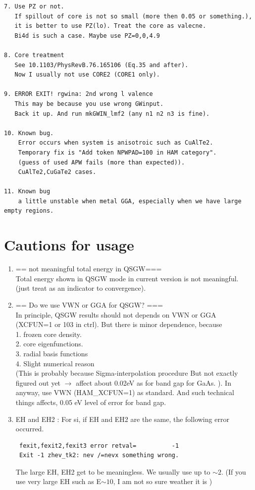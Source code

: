 \documentclass[a4paper,10pt,epsf,fleqn]{article}
\begin{document}
{\begin{verbatim}
7. Use PZ or not.
   If spillout of core is not so small (more then 0.05 or something.),
   it is better to use PZ(lo). Treat the core as valecne.
   Bi4d is such a case. Maybe use PZ=0,0,4.9

8. Core treatment 
   See 10.1103/PhysRevB.76.165106 (Eq.35 and after).
   Now I usually not use CORE2 (CORE1 only).

9. ERROR EXIT! rgwina: 2nd wrong l valence
   This may be because you use wrong GWinput.
   Back it up. And run mkGWIN_lmf2 (any n1 n2 n3 is fine).

10. Known bug.
    Error occurs when system is anisotroic such as CuAlTe2. 
    Temporary fix is "Add token NPWPAD=100 in HAM category".
    (guess of used APW fails (more than expected)).
    CuAlTe2,CuGaTe2 cases.

11. Known bug
    a little unstable when metal GGA, especially when we have large empty regions.
\end{verbatim}

\section{Cautions for usage}
\label{cautionusage}
\begin{enumerate}
 \item == not meaningful total energy in QSGW===\\
 Total energy shown in QSGW mode in current version is not meaningful. 
(just treat as an indicator to convergence).

\item == Do we use VWN or GGA for QSGW? ===\\
  In principle, QSGW results should not depends on VWN or GGA 
  (XCFUN=1 or 103 in ctrl). But there is minor dependence, because\\
   1. frozen core density.\\
   2. core eigenfunctions.\\
   3. radial basis functions\\
   4. Slight numerical reason \\
      (This is probably because Sigma-interpolation procedure
       But not exactly figured out yet
       $\rightarrow$ affect about 0.02eV as for band gap for GaAs. ).
  In anyway, use VWN (HAM\_XCFUN=1) as standard.
  And such technical things affects, 0.05 eV level of error for band gap.

\item{EH and EH2} : For si, if EH and EH2 are the same, the following
     error occurred. 
\begin{verbatim}
 fexit,fexit2,fexit3 error retval=          -1
 Exit -1 zhev_tk2: nev /=nevx something wrong.
\end{verbatim}
     The large EH, EH2 get to be meaningless. We usually use up to 
     $\sim 2$. (If you use very large EH such as E$\sim 10$, I am not so
     sure weather it is )


\end{enumerate}}
\end{document}
